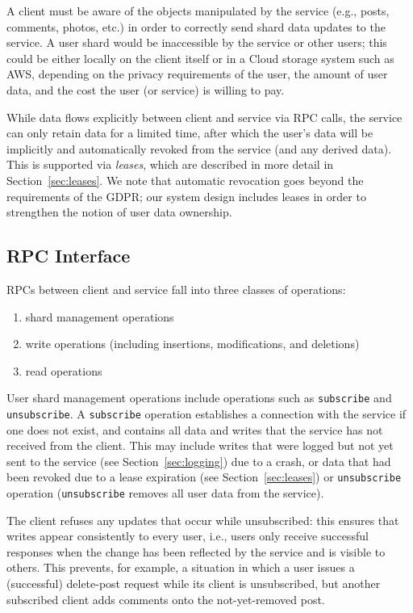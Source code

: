 \documentclass[letterpaper,twocolumn,10pt]{article}
\begin{document}
A client must be aware of the objects manipulated by the service (e.g., posts, comments, photos, etc.) in order
to correctly send shard data updates to the service.
A user shard would be inaccessible by the service or other users; this could be either locally
on the client itself or in a Cloud storage system such as AWS, 
depending on the privacy requirements of the user, the amount of user data, and
the cost the user (or service) is willing to pay.

While data flows explicitly between client and service via RPC calls, 
the service can only retain data for a limited time, after which the user's
data will be implicitly and automatically revoked from the service (and any derived 
data).
This is supported via \emph{leases}, which are described in
more detail in Section~\ref{sec:leases}. 
We note that automatic revocation goes beyond
the requirements of the GDPR; our system design includes leases in order to  
strengthen the notion of user data ownership.

\subsection{RPC Interface}
\label{sec:rpcs}
RPCs between client and service fall into three classes of operations:
\begin{enumerate}
    \item shard management operations
    \item write operations (including insertions, modifications, and deletions)
    \item read operations
\end{enumerate}

User shard management operations include operations such as \texttt{subscribe} and \texttt{unsubscribe}. 
A \texttt{subscribe} operation establishes a connection with the service if one does not exist, and contains all data and writes that the service has not received from the client. This may include writes that were logged but not yet sent to the service (see Section~\ref{sec:logging}) due to a crash, or data that had been revoked due to a lease expiration (see Section~\ref{sec:leases}) or \texttt{unsubscribe} operation (\texttt{unsubscribe} removes all user data from the service).

The client refuses any updates that occur while unsubscribed: this ensures that writes appear consistently to every user, i.e., 
users only receive successful responses when the change has been reflected by the service and is visible to others.
This prevents, for example, a situation in which a user issues a (successful) delete-post request while its client is unsubscribed, but another subscribed client adds comments onto the not-yet-removed post.
\end{document}
